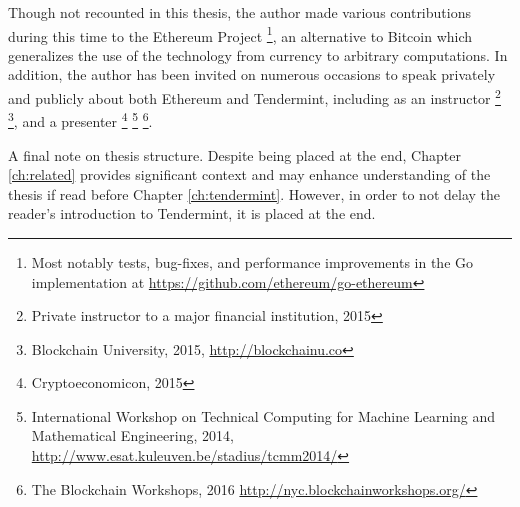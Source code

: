 Though not recounted in this thesis, the author made various contributions during this time to the Ethereum Project
\footnote{Most notably tests, bug-fixes, and performance improvements in the Go implementation at \url{https://github.com/ethereum/go-ethereum}},
an alternative to Bitcoin which generalizes the use of the technology from currency to arbitrary computations.
In addition, the author has been invited on numerous occasions to speak privately and publicly about both Ethereum and Tendermint,
including as an instructor 
\footnote{Private instructor to a major financial institution, 2015} 
\footnote{Blockchain University, 2015, \url{http://blockchainu.co}}, 
 and a presenter 
\footnote{Cryptoeconomicon, 2015} 
\footnote{International Workshop on Technical Computing for Machine Learning and Mathematical Engineering, 2014, \url{http://www.esat.kuleuven.be/stadius/tcmm2014/}}
\footnote{The Blockchain Workshops, 2016 \url{http://nyc.blockchainworkshops.org/}}.

A final note on thesis structure. Despite being placed at the end, Chapter \ref{ch:related} provides significant context 
and may enhance understanding of the thesis if read before Chapter \ref{ch:tendermint}. However, in order to not delay the reader's introduction to Tendermint,
it is placed at the end.
